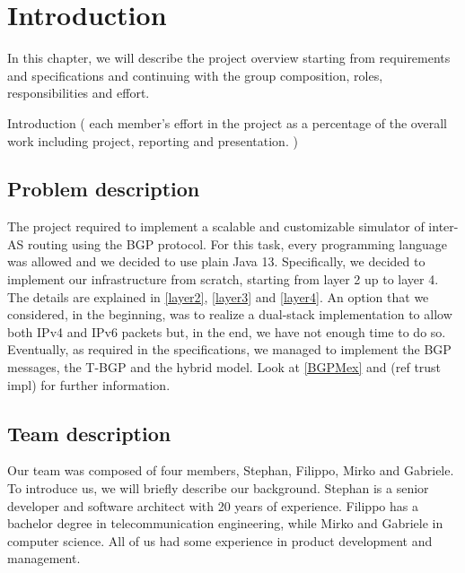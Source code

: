\chapter{Introduction}
In this chapter, we will describe the project overview starting from requirements and specifications and continuing with the group composition, roles, responsibilities and effort.

Introduction (
 each member's effort in the project as a percentage of the overall work including project,
 reporting and presentation.
)

\section{Problem description}
The project required to implement a scalable and customizable simulator of inter-AS routing using the BGP protocol.
For this task, every programming language was allowed and we decided to use plain Java 13.
Specifically, we decided to implement our infrastructure from scratch, starting from layer 2 up to layer 4. The details are explained in \ref{layer2}, \ref{layer3} and \ref{layer4}.
An option that we considered, in the beginning, was to realize a dual-stack implementation to allow both IPv4 and IPv6 packets but, in the end, we have not enough time to do so.
Eventually, as required in the specifications, we managed to implement the BGP messages, the T-BGP and the hybrid model. Look at \ref{BGPMex} and (ref trust impl) for further information.

\section{Team description}
Our team was composed of four members, Stephan, Filippo, Mirko and Gabriele. To introduce us, we will briefly describe our background.\newline
Stephan is a senior developer and software architect with 20 years of experience.\newline
Filippo has a bachelor degree in telecommunication engineering, while Mirko and Gabriele in computer science.\newline
All of us had some experience in product development and management.

